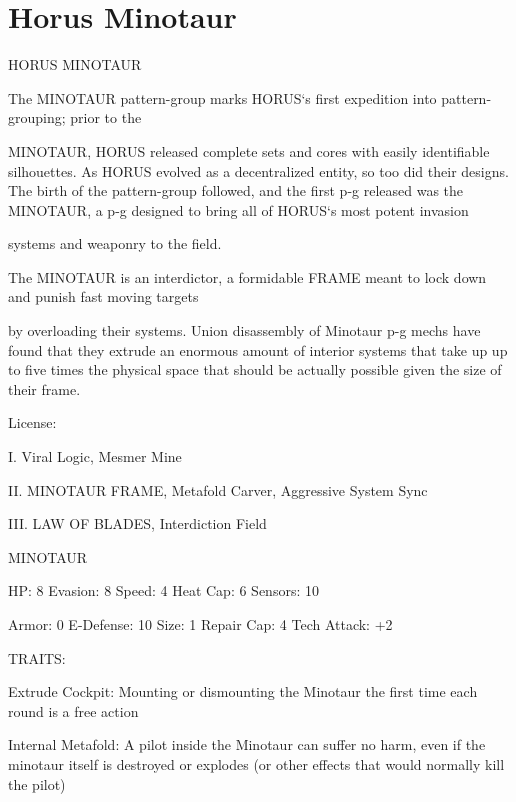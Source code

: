 \section{Horus Minotaur}


                                          HORUS MINOTAUR  

The MINOTAUR pattern-group marks HORUS‘s first expedition into pattern-grouping; prior to the  

MINOTAUR, HORUS released complete sets and cores with easily identifiable silhouettes. As HORUS  
evolved as a decentralized entity, so too did their designs. The birth of the pattern-group followed, and the  
first p-g released was the MINOTAUR, a p-g designed to bring all of HORUS‘s most potent invasion  

systems and weaponry to the field.   

The MINOTAUR is an interdictor, a formidable FRAME meant to lock down and punish fast moving targets  

by overloading their systems. Union disassembly of Minotaur p-g mechs have found that they extrude an  
enormous amount of interior systems that take up up to five times the physical space that should be  
actually possible given the size of their frame.  

                                                    License:
 
I. Viral Logic, Mesmer Mine
 
II. MINOTAUR FRAME, Metafold Carver, Aggressive System Sync
 
III. LAW OF BLADES, Interdiction Field
 

                                                 MINOTAUR 

 HP: 8           Evasion: 8                            Speed: 4            Heat Cap: 6        Sensors: 10 

 Armor: 0        E-Defense: 10                         Size: 1             Repair Cap: 4      Tech Attack:  
                                                                                              +2 

                                                    TRAITS: 

 Extrude Cockpit: Mounting or dismounting the Minotaur the first time each round is a free action
 
 Internal Metafold: A pilot inside the Minotaur can suffer no harm, even if the minotaur itself is  
 destroyed or explodes (or other effects that would normally kill the pilot)
 
